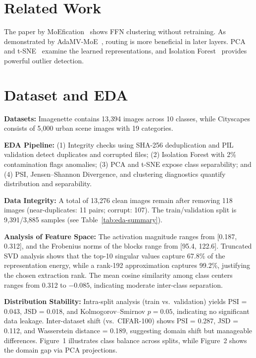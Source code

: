 \documentclass[conference]{IEEEtran}
\begin{document}
\section{Related Work}
The paper by MoEfication~\cite{zhang2022} shows FFN clustering without retraining. 
As demonstrated by AdaMV-MoE~\cite{chen2023}, routing is more beneficial in later layers. 
PCA and t-SNE~\cite{pearson1901,vanderm2008} examine the learned representations, 
and Isolation Forest~\cite{liu2008} provides powerful outlier detection.

\section{Dataset and EDA}

\textbf{Datasets:} Imagenette contains 13,394 images across 10 classes, while 
Cityscapes consists of 5,000 urban scene images with 19 categories.

\textbf{EDA Pipeline:} 
(1) Integrity checks using SHA-256 deduplication and PIL validation detect duplicates and corrupted files; 
(2) Isolation Forest with 2\% contamination flags anomalies; 
(3) PCA and t-SNE expose class separability; and 
(4) PSI, Jensen--Shannon Divergence, and clustering diagnostics quantify distribution and separability.

\textbf{Data Integrity:} 
A total of 13,276 clean images remain after removing 118 images (near-duplicates: 11 pairs; corrupt: 107). 
The train/validation split is 9,391/3,885 samples (see Table~\ref{tab:eda-summary}).

\textbf{Analysis of Feature Space:} 
The activation magnitude ranges from [0.187, 0.312], and the Frobenius norms of the blocks range from [95.4, 122.6]. 
Truncated SVD analysis shows that the top-10 singular values capture 67.8\% of the representation energy, 
while a rank-192 approximation captures 99.2\%, justifying the chosen extraction rank. 
The mean cosine similarity among class centers ranges from 0.312 to $-0.085$, indicating moderate inter-class separation.

\textbf{Distribution Stability:} 
Intra-split analysis (train vs.\ validation) yields PSI = 0.043, JSD = 0.018, and Kolmogorov--Smirnov $p = 0.05$, 
indicating no significant data leakage. 
Inter-dataset shift (vs.\ CIFAR-100) shows PSI = 0.287, JSD = 0.112, and Wasserstein distance = 0.189, 
suggesting domain shift but manageable differences. 
Figure~1 illustrates class balance across splits, while Figure~2 shows the domain gap via PCA projections.
\end{document}
